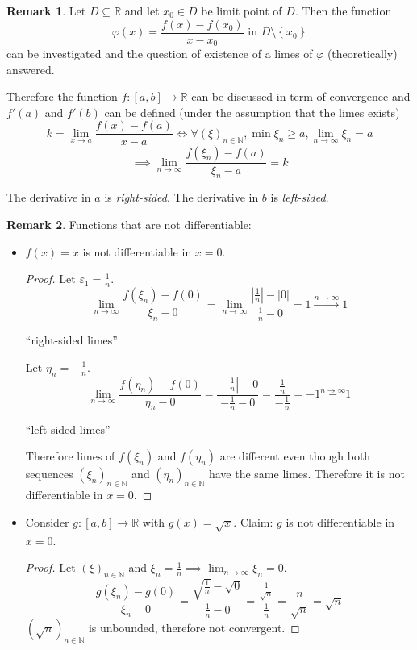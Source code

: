\documentclass[a4paper,landscape,twocolumn]{article}
\theoremstyle{definition}
\newtheorem{rem}{Remark}
\newcommand\set[1]{\left\{#1\right\}}
\newcommand\abs[1]{\left|#1\right|}
\newcommand\seq[1]{{\left(#1\right)}_{n \in \mathbb N}}
\begin{document}
\begin{rem}
  Let $D \subseteq \mathbb R$ and let $x_0 \in D$ be limit point of $D$.
  Then the function
  \[ \varphi(x) = \frac{f(x) - f(x_0)}{x - x_0} \text{ in } D \setminus \set{x_0} \]
  can be investigated and the question of existence of a limes of $\varphi$ (theoretically) answered.

  Therefore the function $f: [a, b] \to \mathbb R$ can be discussed in term of convergence
  and $f'(a)$ and $f'(b)$ can  be defined (under the assumption that the limes exists)
  \[ k = \lim_{x \to a} \frac{f(x) - f(a)}{x - a} \iff \forall \seq{\xi}, \min{\xi_n} \geq a, \lim_{n\to\infty} \xi_n = a \]
  \[ \implies \lim_{n\to\infty} \frac{f(\xi_n) - f(a)}{\xi_n - a} = k \]

  The derivative in $a$ is \emph{right-sided}.
  The derivative in $b$ is \emph{left-sided}.
\end{rem}
\begin{rem}
  Functions that are not differentiable:
  \begin{itemize}
    \item $f(x) = x$ is not differentiable in $x = 0$.
      \begin{proof}
        Let $\varepsilon_1 = \frac1n$.
        \[
          \lim_{n\to\infty} \frac{f(\xi_n) - f(0)}{\xi_n - 0}
          = \lim_{n\to\infty} \frac{\abs{\frac 1n} - \abs{0}}{\frac1n - 0} = 1
          \overset{n\to\infty}{\to} 1
        \]
        \begin{center}
          \enquote{right-sided limes}
        \end{center}
        Let $\eta_n = -\frac1n$.
        \[
          \lim_{n\to\infty} \frac{f(\eta_n) - f(0)}{\eta_n - 0}
          = \frac{\abs{-\frac1n} - 0}{-\frac1n - 0}
          = \frac{\frac1n}{-\frac1n}
          = -1
          \overset{n\to\infty} -1
        \]
        \begin{center}
          \enquote{left-sided limes}
        \end{center}
        Therefore limes of $f(\xi_n)$ and $f(\eta_n)$ are different even though
        both sequences $\seq{\xi_n}$ and $\seq{\eta_n}$ have the same limes.
        Therefore it is not differentiable in $x = 0$.
      \end{proof}
    \item Consider $g: [a, b] \to \mathbb R$ with $g(x) = \sqrt{x}$.
      Claim: $g$ is not differentiable in $x = 0$.
      \begin{proof}
        Let $\seq{\xi}$ and $\xi_n = \frac1n \implies \lim_{n\to\infty} \xi_n = 0$.
        \[
          \frac{g(\xi_n) - g(0)}{\xi_n - 0}
          = \frac{\sqrt{\frac1n} - \sqrt{0}}{\frac1n - 0}
          = \frac{\frac{1}{\sqrt{n}}}{\frac1n}
          = \frac{n}{\sqrt{n}}
          = \sqrt{n}
        \]
        $\seq{\sqrt{n}}$ is unbounded, therefore not convergent.
      \end{proof}
  \end{itemize}
\end{rem}
\end{document}
